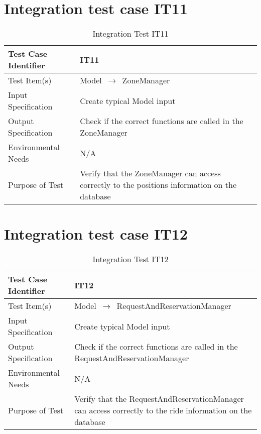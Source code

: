 \documentclass[../../testPlan.tex]{subfiles}
\begin{document}
	\section{Integration test case IT11}
		\begin{table}[H]
			\centering
			\label{IT11}
			\begin{tabular}{ll}
				\hline
				Test Case Identifier & IT11 \\ \hline
				Test Item(s)         & Model $\,\to\,$ ZoneManager\\ \hline
				Input Specification  & Create typical Model input  \\ \hline
				Output Specification & Check if the correct functions are called in the ZoneManager\\ \hline
				Environmental Needs  &  N/A \\ \hline
				Purpose of Test      &  Verify that the ZoneManager can access correctly to the positions information on the database \\ \hline
			\end{tabular}
			\caption{Integration Test IT11}
		\end{table}
		
		
	\section{Integration test case IT12}
		\begin{table}[H]
			\centering
			\label{IT12}
			\begin{tabular}{ll}
				\hline
				Test Case Identifier & IT12 \\ \hline
				Test Item(s)         & Model $\,\to\,$ RequestAndReservationManager\\ \hline
				Input Specification  & Create typical Model input  \\ \hline
				Output Specification & Check if the correct functions are called in the RequestAndReservationManager\\ \hline
				Environmental Needs  &  N/A \\ \hline
				Purpose of Test      &  Verify that the RequestAndReservationManager can access correctly to the ride information on the database \\ \hline
			\end{tabular}
			\caption{Integration Test IT12}
		\end{table}
		
		
\end{document}
